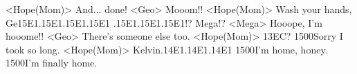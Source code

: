 <Hope(Mom)> And... done! 
<Geo> Mooom!! 
<Hope(Mom)> Wash your hands, Ge{15}{E1}.{15}{E1}.{15}{E1}.{15}{E1} 
.{15}{E1}.{15}{E1}.{15}{E1}!? Mega!? 
<Mega> Hooope, I'm hooome!! 
<Geo> There's someone else too. 
<Hope(Mom)> {13}{EC}? 
{15}{00}Sorry I took so long. 
<Hope(Mom)> Kelvin.{14}{E1}.{14}{E1}.{14}{E1} 
{15}{00}I'm home, honey. 
{15}{00}I'm finally home. 
